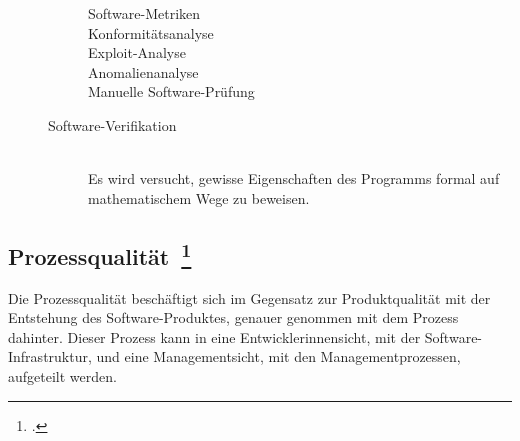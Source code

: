 \begin{description}
\begin{description}
\begin{description}
      \item[Software-Metriken] \hfill 
      \item[Konformitätsanalyse] \hfill 
      \item[Exploit-Analyse] \hfill 
      \item[Anomalienanalyse] \hfill 
      \item[Manuelle Software-Prüfung] \hfill 
    \end{description}
    \item[Software-Verifikation] \hfill \\ Es wird versucht, gewisse Eigenschaften des Programms formal auf mathematischem Wege zu beweisen.
  \end{description}
\end{description}

\clearpage
\subsection[Prozessqualität]{Prozessqualität~\footcite[vgl.][Kapitel 1.4.2]{hoffmann_software_qualitat_2013}}

Die Prozessqualität beschäftigt sich im Gegensatz zur Produktqualität mit der Entstehung des Software-Produktes, genauer genommen mit dem Prozess dahinter.
Dieser Prozess kann in eine Entwicklerinnensicht, mit der Software-Infrastruktur, und eine Managementsicht, mit den Managementprozessen, aufgeteilt werden.

